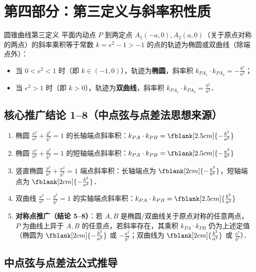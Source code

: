 \documentclass[11pt,a4paper]{ctexart}
\begin{document}
\newpage

\section{第四部分：第三定义与斜率积性质}
\begin{theorembox}{圆锥曲线第三定义}
平面内动点 $P$ 到两定点 $A_1(-a,0), A_2(a,0)$（关于原点对称的两点）的斜率乘积等于常数 $k = e^2 - 1 > -1$ 的点的轨迹为椭圆或双曲线（除端点外）：
\begin{itemize}[itemsep=0.2em]
  \item 当 $0 < e^2 < 1$ 时（即 $k \in (-1,0)$），轨迹为\textbf{椭圆}，斜率积 $k_{PA_1} \cdot k_{PA_2} = -\frac{b^2}{a^2}$；
  \item 当 $e^2 > 1$ 时（即 $k > 0$），轨迹为\textbf{双曲线}，斜率积 $k_{PA_1} \cdot k_{PA_2} = \frac{b^2}{a^2}$．
\end{itemize}
\end{theorembox}

\subsection*{核心推广结论 1--8（中点弦与点差法思想来源）}
\begin{enumerate}[label=\arabic*.]
  \item 椭圆 $\frac{x^2}{a^2} + \frac{y^2}{b^2} = 1$ 的长轴端点斜率积：$k_{PA} \cdot k_{PB} = \fblank[2.5cm]{-\frac{b^2}{a^2}}$ 
  \item 椭圆 $\frac{x^2}{a^2} + \frac{y^2}{b^2} = 1$ 的短轴端点斜率积：$k_{PA} \cdot k_{PB} = \fblank[2.5cm]{-\frac{a^2}{b^2}}$ 
  \item 竖直椭圆 $\frac{y^2}{a^2} + \frac{x^2}{b^2} = 1$ 端点斜率积：长轴端点为 $\fblank[2cm]{-\frac{a^2}{b^2}}$，短轴端点为 $\fblank[2cm]{-\frac{b^2}{a^2}}$．
  \item 双曲线 $\frac{x^2}{a^2} - \frac{y^2}{b^2} = 1$ 的实轴端点斜率积：$k_{PA} \cdot k_{PB} = \fblank[2.5cm]{\frac{b^2}{a^2}}$ 
  \item \textbf{对称点推广（结论 5--8）}：若 $A, B$ 是椭圆/双曲线关于原点对称的任意两点，$P$ 为曲线上异于 $A, B$ 的任意点，若斜率存在，其乘积 $k_{PA} \cdot k_{PB}$ 仍为上述定值（椭圆为 $\fblank[2cm]{-\frac{b^2}{a^2}}$ 或 $-\frac{a^2}{b^2}$；双曲线为 $\fblank[2cm]{\frac{b^2}{a^2}}$ 或 $\frac{a^2}{b^2}$）．
\end{enumerate}

\subsection*{中点弦与点差法公式推导}
\end{document}

